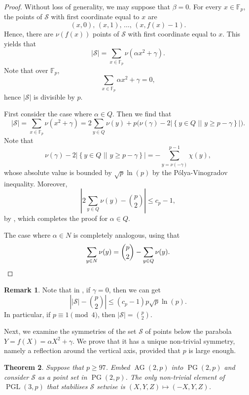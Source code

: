 \documentclass[a4paper, 12pt]{article}
\newtheorem{thm}{Theorem}[section]
\theoremstyle{definition}
\newtheorem{rmk}[thm]{Remark}
\newcommand{\FF}{\mathbb F}
\newcommand{\sett}[2]{ \left\{ #1 \, \, || \, \, #2 \right \} }
\newcommand{\ms}{\mathcal S}
\DeclareMathOperator{\PG}{PG}
\newcommand{\pg}{\PG}
\DeclareMathOperator{\AG}{AG}
\newcommand{\ag}{\AG}
\DeclareMathOperator{\PGL}{PGL}
\begin{document}
\begin{proof}
 Without loss of generality, we may suppose that $\beta = 0$.
 For every $x \in \FF_p$, the points of $\ms$ with first coordinate equal to $x$ are 
 \[
  (x,0),\, (x,1),\, \dots,\, (x,f(x)-1).
 \]
 Hence, there are $\nu(f(x))$ points of $\ms$ with first coordinate equal to $x$.
 This yields that
 \[
  |\ms| = \sum_{x \in \FF_p} \nu(\alpha x^2 + \gamma).
 \]
 Note that over $\FF_p$,
 \[
  \sum_{x \in \FF_p} \alpha x^2 + \gamma = 0,
 \]
 hence $|\ms|$ is divisible by $p$.
 
 First consider the case where $\alpha \in Q$.
 Then we find that
 \[
  |\ms| = \sum_{x \in \FF_p} \nu(x^2 + \gamma) = 2 \sum_{y\in Q} \nu(y) + p \Big( \nu(\gamma) - 2 |\sett{y \in Q}{y \geq p-\gamma}| \Big). 
 \]
 Note that
 \[
  \nu(\gamma) - 2 |\sett{y \in Q}{y \geq p-\gamma}| = - \sum_{y=\nu(-\gamma)}^{p-1} \chi(y),
 \]
 whose absolute value is bounded by $\sqrt p \ln(p)$ by the P\'olya-Vinogradov inequality.
 Moreover,
 \[
  \left| 2 \sum_{y \in Q} \nu(y) - \binom p 2 \right| \leq c_p - 1,
 \]
 by , which completes the proof for $\alpha \in Q$.

 The case where $\alpha \in N$ is completely analogous, using that
 \[
  \sum_{y \in N} \nu(y) = \binom p 2 - \sum_{y \in Q} \nu(y). \qedhere
 \]
\end{proof}

\begin{rmk}
 Note that in , if $\gamma = 0$, then we can get
 \[
  \left||\ms| - \binom p 2\right| \leq (c_p-1) p \sqrt p \ln(p).
 \]
 In particular, if $p \equiv 1 \pmod 4$, then $|\ms| = \binom p 2$.
\end{rmk}

Next, we examine the symmetries of the set $\ms$ of points below the parabola $Y = f(X) = \alpha X^2 + \gamma$.
We prove that it has a unique non-trivial symmetry, namely a reflection around the vertical axis, provided that $p$ is large enough.

\begin{thm}
\label{thm:sym}
 Suppose that $p \geq 97$.
 Embed $\ag(2,p)$ into $\pg(2,p)$ and consider $\ms$ as a point set in $\pg(2,p)$.
 The only non-trivial element of $\PGL(3,p)$ that stabilises $\ms$ setwise is $(X,Y,Z) \mapsto (-X,Y,Z)$.
\end{thm}
\end{document}
